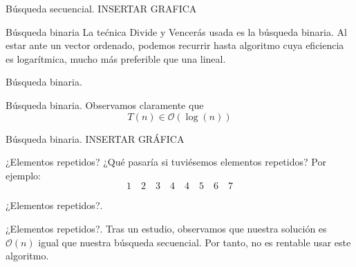 \documentclass[10pt, xcolor=table]{beamer}
\begin{document}
\begin{frame}[fragile]{Búsqueda secuencial. }
INSERTAR GRAFICA
\end{frame}

\begin{frame}[fragile]{Búsqueda binaria}
La tećnica Divide y Vencerás usada es la búsqueda binaria. Al estar ante un vector ordenado, podemos recurrir hasta algoritmo cuya eficiencia es logarítmica, mucho más preferible que una lineal.
\end{frame}

\begin{frame}[fragile]{Búsqueda binaria. }

\end{frame}

\begin{frame}[fragile]{Búsqueda binaria. }
Observamos claramente que 
\[
	T(n) \in \mathcal{O}(\log(n))
\]
\end{frame}


\begin{frame}[fragile]{Búsqueda binaria. }
INSERTAR GRÁFICA
\end{frame}

\begin{frame}[fragile]{¿Elementos repetidos?}
¿Qué pasaría si tuviésemos elementos repetidos? Por ejemplo:
\[
	1 \quad 2 \quad 3 \quad 4 \quad 4 \quad 5 \quad 6 \quad 7
\]
\end{frame}

\begin{frame}[fragile]{¿Elementos repetidos?. }

\end{frame}

\begin{frame}[fragile]{¿Elementos repetidos?. }
Tras un estudio, observamos que nuestra solución es \(\mathcal{O}(n)\) igual que nuestra búsqueda secuencial. Por tanto, no es rentable usar este algoritmo.
\end{frame}
\end{document}
